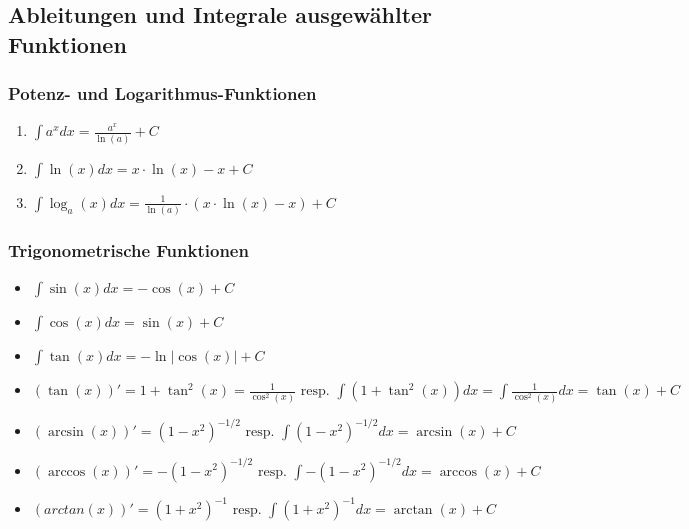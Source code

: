 \subsection{Ableitungen und Integrale ausgewählter Funktionen}
\subsubsection{Potenz- und Logarithmus-Funktionen}
\begin{enumerate}
    \item $\int a^x dx = \frac{a^x}{\ln(a)} + C$
    \item $\int \ln(x) dx = x \cdot \ln(x) - x + C$
    \item $\int \log_a (x)dx = \frac{1}{\ln(a)}\cdot (x \cdot \ln(x) - x) + C$
\end{enumerate}

\subsubsection{Trigonometrische Funktionen}
\begin{itemize}
    \item $\int \sin (x) dx = - \cos (x) + C$
    \item $\int \cos (x) dx = \sin (x) + C$
    \item $\int \tan (x) dx = - \ln |\cos (x) | + C$
    \item $(\tan(x))' = 1 + \tan^2(x) = \frac{1}{\cos^2(x)} \text{ resp. } \int(1+\tan^2(x)) dx = \int \frac{1}{\cos^2(x)} dx = \tan(x) + C$
    \item $(\arcsin (x))'= (1-x^2)^{-1/2} \text{ resp. } \int (1-x^2)^{-1/2}dx= \arcsin(x) + C$
    \item $(\arccos(x))' = -(1-x^2)^{-1/2} \text{ resp. } \int - (1 - x^2)^{-1/2} dx = \arccos(x) + C$
    \item $(arctan(x))' = (1 + x^2)^{-1} \text{ resp. } \int (1 + x^2)^{-1} dx = \arctan(x) + C$
\end{itemize}

